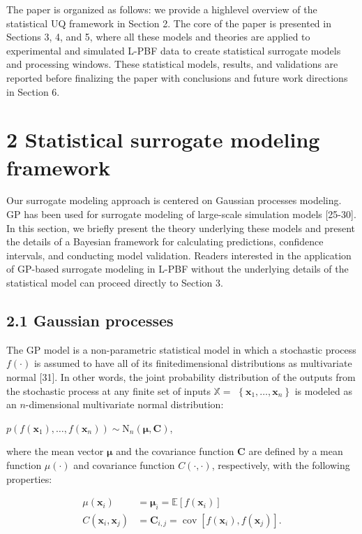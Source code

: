 \documentclass[10pt]{article}
\begin{document}
The paper is organized as follows: we provide a highlevel overview of the statistical UQ framework in Section 2. The core of the paper is presented in Sections 3, 4, and 5, where all these models and theories are applied to experimental and simulated L-PBF data to create statistical surrogate models and processing windows. These statistical models, results, and validations are reported before finalizing the paper with conclusions and future work directions in Section 6.

\section*{2 Statistical surrogate modeling framework}
Our surrogate modeling approach is centered on Gaussian processes modeling. GP has been used for surrogate modeling of large-scale simulation models [25-30]. In this section, we briefly present the theory underlying these models and present the details of a Bayesian framework for calculating predictions, confidence intervals, and conducting model validation. Readers interested in the application of GP-based surrogate modeling in L-PBF without the underlying details of the statistical model can proceed directly to Section 3.

\subsection*{2.1 Gaussian processes}
The GP model is a non-parametric statistical model in which a stochastic process $f(\cdot)$ is assumed to have all of its finitedimensional distributions as multivariate normal [31]. In other words, the joint probability distribution of the outputs from the stochastic process at any finite set of inputs $\mathbb{X}=$ $\left\{\mathbf{x}_{1}, \ldots, \mathbf{x}_{n}\right\}$ is modeled as an $n$-dimensional multivariate normal distribution:

$p\left(f\left(\mathbf{x}_{1}\right), \ldots, f\left(\mathbf{x}_{n}\right)\right) \sim \mathrm{N}_{n}(\boldsymbol{\mu}, \mathbf{C})$,

where the mean vector $\boldsymbol{\mu}$ and the covariance function $\mathbf{C}$ are defined by a mean function $\mu(\cdot)$ and covariance function $C(\cdot, \cdot)$, respectively, with the following properties:

$$
\begin{aligned}
\mu\left(\mathbf{x}_{i}\right) & =\boldsymbol{\mu}_{i}=\mathbb{E}\left[f\left(\mathbf{x}_{i}\right)\right] \\
C\left(\mathbf{x}_{i}, \mathbf{x}_{j}\right) & =\mathbf{C}_{i, j}=\operatorname{cov}\left[f\left(\mathbf{x}_{i}\right), f\left(\mathbf{x}_{j}\right)\right] .
\end{aligned}
$$
\end{document}
